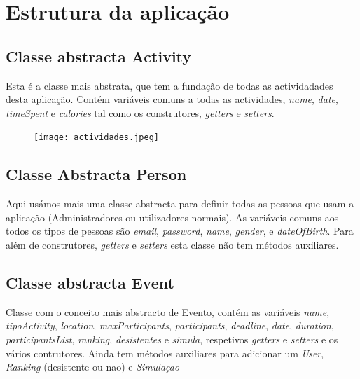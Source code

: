 ﻿\documentclass[10pt,notitlepage]{article}
\begin{document}
\newpage

\tableofcontents

\newpage


\section{Estrutura da aplicação}

\subsection{Classe abstracta Activity}

Esta é a classe mais abstrata, que tem a fundação de todas as actividadades desta aplicação. Contém variáveis comuns a todas as actividades, \textit{name}, \textit{date}, \textit{timeSpent} e \textit{calories} tal como os construtores, \textit{getters} e  \textit{setters}.

\begin{figure}[h]
\centering
\texttt{[image: actividades.jpeg]}
\end{figure}


\subsection{Classe Abstracta Person}

Aqui usámos mais uma classe abstracta para definir todas as pessoas que usam a aplicação (Administradores ou utilizadores normais). As variáveis comuns aos todos os tipos de pessoas são \textit{email}, \textit{password}, \textit{name}, \textit{gender}, e \textit{dateOfBirth}. Para além de 
construtores, \textit{getters} e \textit{setters} esta classe não tem métodos auxiliares.





\subsection{Classe abstracta Event}

Classe com o conceito mais abstracto de Evento, contém as variáveis \textit{name}, \textit{tipoActivity}, \textit{location}, \textit{maxParticipants}, \textit{participants}, \textit{deadline}, \textit{date}, \textit{duration}, \textit{participantsList}, \textit{ranking}, \textit{desistentes} e \textit{simula}, respetivos \textit{getters} e \textit{setters} e os vários contrutores. Ainda tem métodos auxiliares para adicionar um \textit{User}, \textit{Ranking} (desistente ou nao) e \textit{Simulaçao}
\end{document}
